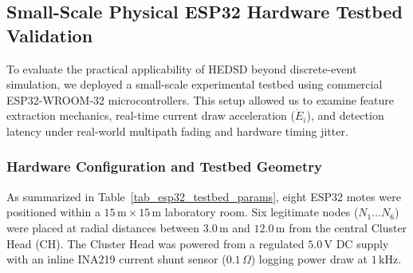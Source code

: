 \documentclass[conference]{IEEEtran}
\begin{document}
\subsection{Small-Scale Physical ESP32 Hardware Testbed Validation}
To evaluate the practical applicability of HEDSD beyond discrete-event simulation, we deployed a small-scale experimental testbed using commercial ESP32-WROOM-32 microcontrollers. This setup allowed us to examine feature extraction mechanics, real-time current draw acceleration ($\dot{E}_i$), and detection latency under real-world multipath fading and hardware timing jitter.

\begin{table}[htbp]
\caption{Physical ESP32 Testbed Operational Parameters}
\label{tab_esp32_testbed_params}
\centering
\small
\renewcommand{\arraystretch}{1.15}
\end{table}

\subsubsection{Hardware Configuration and Testbed Geometry}
As summarized in Table~\ref{tab_esp32_testbed_params}, eight ESP32 motes were positioned within a $15\,\text{m} \times 15\,\text{m}$ laboratory room. Six legitimate nodes ($N_1 \dots N_6$) were placed at radial distances between $3.0\,\text{m}$ and $12.0\,\text{m}$ from the central Cluster Head ($\text{CH}$). The Cluster Head was powered from a regulated $5.0\,\text{V}$ DC supply with an inline INA219 current shunt sensor ($0.1\,\Omega$) logging power draw at $1\,\text{kHz}$.
\end{document}
